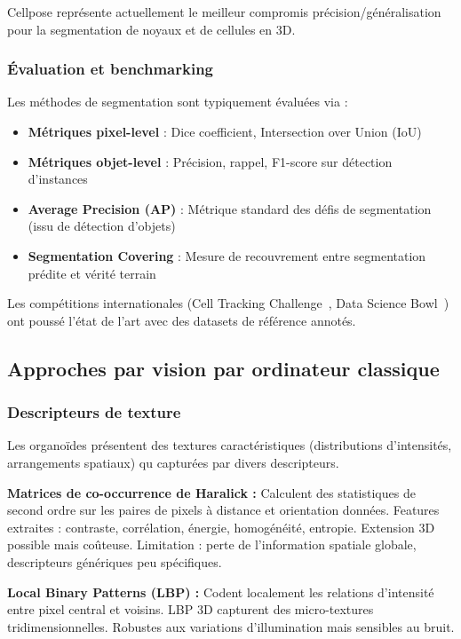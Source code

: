 Cellpose représente actuellement le meilleur compromis précision/généralisation pour la segmentation de noyaux et de cellules en 3D.

\subsubsection{Évaluation et benchmarking}

Les méthodes de segmentation sont typiquement évaluées via :
\begin{itemize}
    \item \textbf{Métriques pixel-level} : Dice coefficient, Intersection over Union (IoU)
    \item \textbf{Métriques objet-level} : Précision, rappel, F1-score sur détection d'instances
    \item \textbf{Average Precision (AP)} : Métrique standard des défis de segmentation (issu de détection d'objets)
    \item \textbf{Segmentation Covering} : Mesure de recouvrement entre segmentation prédite et vérité terrain
\end{itemize}

Les compétitions internationales (Cell Tracking Challenge~\cite{Ulman2017}, Data Science Bowl~\cite{Caicedo2019}) ont poussé l'état de l'art avec des datasets de référence annotés.

\subsection{Approches par vision par ordinateur classique}

\subsubsection{Descripteurs de texture}

Les organoïdes présentent des textures caractéristiques (distributions d'intensités, arrangements spatiaux) qu capturées par divers descripteurs.

\textbf{Matrices de co-occurrence de Haralick :}
Calculent des statistiques de second ordre sur les paires de pixels à distance et orientation données. Features extraites : contraste, corrélation, énergie, homogénéité, entropie. Extension 3D possible mais coûteuse. Limitation : perte de l'information spatiale globale, descripteurs génériques peu spécifiques.

\textbf{Local Binary Patterns (LBP) :}
Codent localement les relations d'intensité entre pixel central et voisins. LBP 3D capturent des micro-textures tridimensionnelles. Robustes aux variations d'illumination mais sensibles au bruit.

